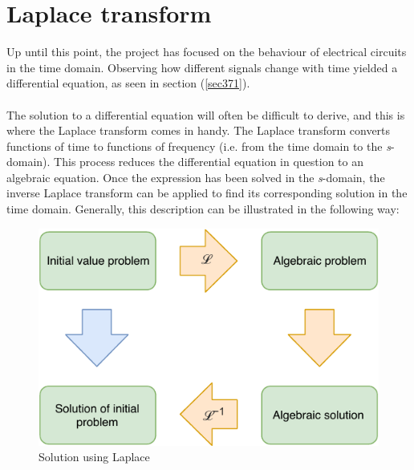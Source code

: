 \chapter{Laplace transform}
Up until this point, the project has focused on the behaviour of electrical circuits in the time domain. Observing how different signals change with time yielded a differential equation, as seen in section (\ref{sec371}).
\\ \\
The solution to a differential equation will often be difficult to derive, and this is where the Laplace transform comes in handy. The Laplace transform converts functions of time to functions of frequency (i.e. from the time domain to the \textit{s}-domain). This process reduces the differential equation in question to an algebraic equation. Once the expression has been solved in the \textit{s}-domain, the inverse Laplace transform can be applied to find its corresponding solution in the time domain. Generally, this description can be illustrated in the following way:
\begin{figure}[H]
\center
\includegraphics[scale=1]{fig/img/laplace_circ.pdf}
\caption{Solution using Laplace}
\end{figure}

